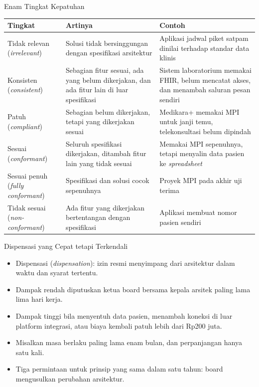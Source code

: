 \documentclass[aspectratio=169, table, 12pt]{beamer}
\begin{document}
\begin{frame}{{\Large Enam Tingkat Kepatuhan}}
  \scriptsize
  \begin{tabularx}{\textwidth}{L{2.6cm}YY}
    \hline
    \textbf{Tingkat} & \textbf{Artinya} & \textbf{Contoh} \\
    \hline
    Tidak relevan (\textit{irrelevant}) & Solusi tidak bersinggungan dengan spesifikasi arsitektur &
      Aplikasi jadwal piket satpam dinilai terhadap standar data klinis \\
    \hline
    Konsisten (\textit{consistent}) & Sebagian fitur sesuai, ada yang belum dikerjakan, dan ada fitur
      lain di luar spesifikasi & Sistem laboratorium memakai FHIR, belum mencatat akses, dan menambah
      saluran pesan sendiri \\
    \hline
    Patuh (\textit{compliant}) & Sebagian belum dikerjakan, tetapi yang dikerjakan sesuai &
      Medikara+ memakai MPI untuk janji temu, telekonsultasi belum dipindah \\
    \hline
    Sesuai (\textit{conformant}) & Seluruh spesifikasi dikerjakan, ditambah fitur lain yang tidak sesuai &
      Memakai MPI sepenuhnya, tetapi menyalin data pasien ke \textit{spreadsheet} \\
    \hline
    Sesuai penuh (\textit{fully conformant}) & Spesifikasi dan solusi cocok sepenuhnya &
      Proyek MPI pada akhir uji terima \\
    \hline
    Tidak sesuai (\textit{non-conformant}) & Ada fitur yang dikerjakan bertentangan dengan spesifikasi &
      Aplikasi membuat nomor pasien sendiri \\
    \hline
  \end{tabularx}
\end{frame}

\begin{frame}{{\Large Dispensasi yang Cepat tetapi Terkendali}}
  \small
  \vspace{4pt}
  \begin{itemize}
    \item Dispensasi (\textit{dispensation}): izin resmi menyimpang dari arsitektur dalam waktu dan
          syarat tertentu.
    \item Dampak rendah diputuskan ketua board bersama kepala arsitek paling lama lima hari kerja.
    \item Dampak tinggi bila menyentuh data pasien, menambah koneksi di luar platform integrasi, atau
          biaya kembali patuh lebih dari Rp200 juta.
    \item Misalkan masa berlaku paling lama enam bulan, dan perpanjangan hanya satu kali.
    \item Tiga permintaan untuk prinsip yang sama dalam satu tahun: board mengusulkan perubahan
          arsitektur.
  \end{itemize}
\end{frame}
\end{document}
